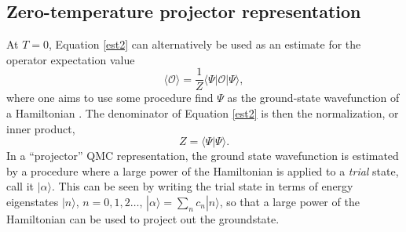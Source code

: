 \documentclass[vecphys]{svmult}
\begin{document}
\subsection{Zero-temperature projector representation} \label{secT0}

At $T=0$, Equation \ref{est2} can alternatively be used as an estimate for the operator expectation value
\begin{equation}
\langle \mathcal{O} \rangle  = \frac{1}{Z} \langle \Psi | \mathcal{O} | \Psi \rangle, \label{zeroExpet}
\end{equation}
where one aims to use some procedure find $\Psi$ as the ground-state wavefunction of a Hamiltonian \cite{Melko:Sandvik05}.  
The denominator of Equation \ref{est2} is then the normalization, or inner product,
\begin{equation}
Z =  \langle \Psi | \Psi \rangle.
\end{equation}
In a ``projector'' QMC representation, the ground state wavefunction is estimated by a procedure where a large power of the Hamiltonian is applied to a {\it trial} state, call it $|\alpha \rangle$.  This can be seen by writing the trial state in terms of energy eigenstates $|n \rangle$, $n=0,1,2 \ldots$,
$|\alpha \rangle= \sum_n c_n |n \rangle$, so that 
a large power of the Hamiltonian can be used to project out the groundstate.  
\end{document}
